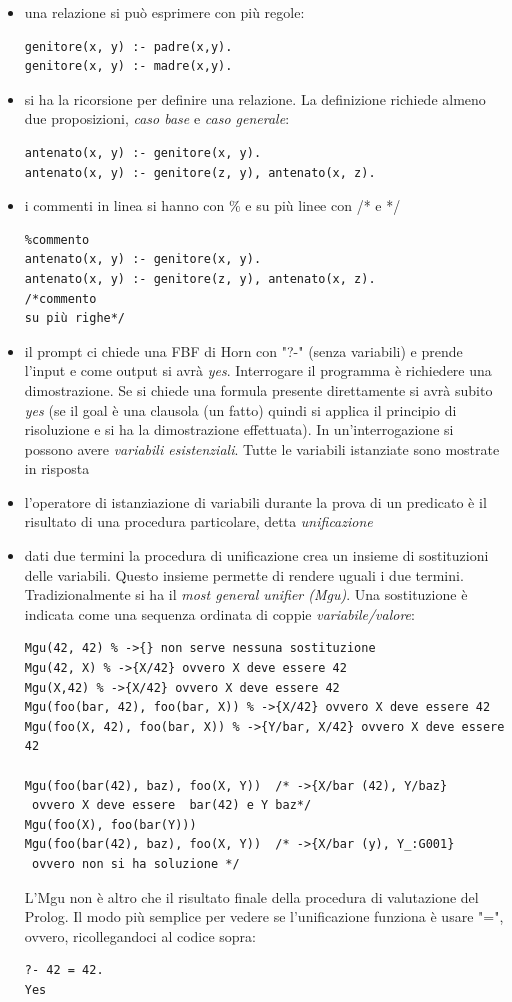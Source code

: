 \documentclass[a4paper,12pt, oneside]{book}
\begin{document}
\begin{itemize}
	\item una relazione si può esprimere con più regole:
	      \begin{verbatim}
genitore(x, y) :- padre(x,y).
genitore(x, y) :- madre(x,y).
\end{verbatim}
	\item si ha la ricorsione per definire una relazione. La definizione richiede almeno due proposizioni, \textit{caso base} e \textit{caso generale}:
	      \begin{verbatim}
antenato(x, y) :- genitore(x, y).
antenato(x, y) :- genitore(z, y), antenato(x, z).
\end{verbatim}
	\item i commenti in linea si hanno con \% e su più linee con /* e */
	      \begin{verbatim}
%commento
antenato(x, y) :- genitore(x, y).
antenato(x, y) :- genitore(z, y), antenato(x, z).
/*commento
su più righe*/
\end{verbatim}
	\item il prompt ci chiede una FBF di Horn con "?-" (senza variabili) e prende l'input e come output si avrà \textit{yes}. Interrogare il programma è richiedere una dimostrazione. Se si chiede una formula presente direttamente si avrà subito \textit{yes} (se il goal è una clausola (un fatto) quindi si applica il principio di risoluzione e si ha la dimostrazione effettuata). In un'interrogazione si possono avere \textit{variabili esistenziali}. Tutte le variabili istanziate sono mostrate in risposta
	\item l'operatore di istanziazione di variabili durante la prova di un predicato è il risultato di una procedura particolare, detta \textit{unificazione}
	\item dati due termini la procedura di unificazione crea un insieme di sostituzioni delle variabili. Questo insieme permette di rendere uguali i due termini. Tradizionalmente si ha il \textit{most general unifier (Mgu)}. Una sostituzione è indicata come una sequenza ordinata di coppie \textit{variabile/valore}:
	      \begin{verbatim}
Mgu(42, 42) % ->{} non serve nessuna sostituzione
Mgu(42, X) % ->{X/42} ovvero X deve essere 42
Mgu(X,42) % ->{X/42} ovvero X deve essere 42
Mgu(foo(bar, 42), foo(bar, X)) % ->{X/42} ovvero X deve essere 42
Mgu(foo(X, 42), foo(bar, X)) % ->{Y/bar, X/42} ovvero X deve essere 42

Mgu(foo(bar(42), baz), foo(X, Y))  /* ->{X/bar (42), Y/baz}
 ovvero X deve essere  bar(42) e Y baz*/
Mgu(foo(X), foo(bar(Y))) 
Mgu(foo(bar(42), baz), foo(X, Y))  /* ->{X/bar (y), Y_:G001}
 ovvero non si ha soluzione */
\end{verbatim}
	      L'Mgu non è altro che il risultato finale della procedura di valutazione del Prolog. Il modo più semplice per vedere se l'unificazione funziona è usare "=", ovvero, ricollegandoci al codice sopra:
	      \begin{verbatim}
?- 42 = 42.
Yes


\end{verbatim}
\end{itemize}
\end{document}
